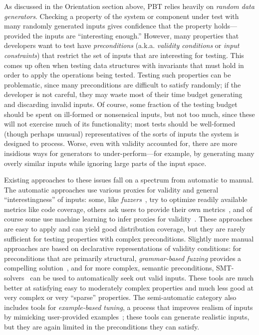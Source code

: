 As discussed in the Orientation section above, PBT relies heavily on {\em random data
generators}.  Checking a property of the system or component under
test with many randomly generated inputs gives confidence that the property
holds---provided the inputs are ``interesting enough.''
%
However,
many properties that developers want to test have {\em preconditions}
(a.k.a.{} {\em validity conditions} or {\em input constraints}) that
restrict the set of inputs that are interesting for testing. This comes up often
when testing data structures with invariants that must hold in order to apply
the operations being tested. Testing such properties can be problematic, since
many preconditions are difficult to satisfy randomly; if the developer is not
careful, they may waste most of their time budget generating and
discarding invalid inputs.
%
Of course, some fraction of the testing budget should be spent on
ill-formed or nonsensical inputs, but not too much, since these will not
exercise much of its functionality; most tests should be well-formed
(though perhaps unusual) representatives of the sorts of inputs the
system is designed to process.
%
Worse, even with validity accounted for, there are
more insidious ways for generators to under-perform---for example, by
generating many overly similar inputs while ignoring large parts of
the input space.


Existing approaches to these issues
fall on a spectrum from automatic to manual. The automatic approaches use
various proxies for validity and general ``interestingness'' of
inputs: some, like {\em
fuzzers}~\cite{afl-readme}, try to optimize readily available metrics like code
coverage, others ask users to provide their own metrics~\cite{loscher2017targetedpbt}, and
of course some use machine learning to infer proxies for
validity~\cite{godefroid2017learn, DBLP:conf/icse/ReddyLPS20}. These approaches
are easy to apply and can yield good distribution coverage, but they are rarely
sufficient for testing properties with complex preconditions. Slightly more
manual approaches are based on declarative representations of validity
conditions: for preconditions that are primarily structural, {\em grammar-based
fuzzing} provides a compelling solution~\cite{godefroid2008grammar,
holler2012fuzzing, veggalam2016ifuzzer, wang2019superion,
srivastava2021gramatron}, and for more complex, semantic preconditions,
SMT-solvers~\cite{dewey2017automated, LuckPOPL,
steinhofel2022input} can be used to automatically seek out valid
inputs. These tools are
much better at satisfying easy to moderately complex properties and
much less good at very complex or very ``sparse'' properties. The semi-automatic
category also includes tools for {\em example-based tuning}, a process that
improves realism of inputs by mimicking user-provided
examples~\cite{soremekun2020inputs}; these tools can generate
realistic inputs, but they are again limited in the preconditions they can
satisfy.

